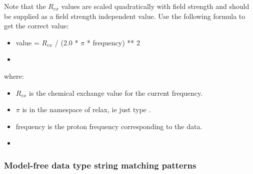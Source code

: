  Note that the $R_{ex}$ values are scaled quadratically with field strength and should be supplied as a field strength independent value.  Use the following formula to get the correct value: 
  

 \begin{itemize} 
 \item[] value = $R_{ex}$ / (2.0 * $\pi$ * frequency) ** 2  
 \item[]  
 \end{itemize} 
  

 where: 
  

 \begin{itemize} 
 \item[] $R_{ex}$ is the chemical exchange value for the current frequency.  
 \item[] $\pi$ is in the namespace of relax, ie just type .  
 \item[] frequency is the proton frequency corresponding to the data.  
 \item[]  
 \end{itemize} 
  

  
 \subsubsection{Model-free data type string matching patterns} 

